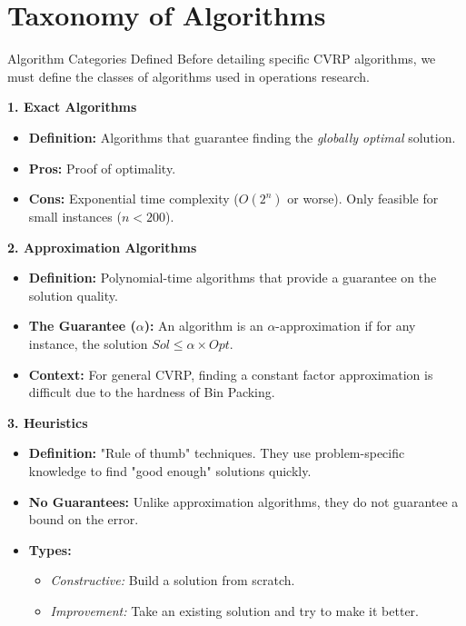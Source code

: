 \documentclass{beamer}
\begin{document}
\section{Taxonomy of Algorithms}

\begin{frame}[allowframebreaks]{Algorithm Categories Defined}
    Before detailing specific CVRP algorithms, we must define the classes of algorithms used in operations research.
    
    \vspace{1em}
    \textbf{1. Exact Algorithms}
    \begin{itemize}
        \item \textbf{Definition:} Algorithms that guarantee finding the \textit{globally optimal} solution.
        \item \textbf{Pros:} Proof of optimality.
        \item \textbf{Cons:} Exponential time complexity ($O(2^n)$ or worse). Only feasible for small instances ($n < 200$).
    \end{itemize}

    \framebreak

    \textbf{2. Approximation Algorithms}
    \begin{itemize}
        \item \textbf{Definition:} Polynomial-time algorithms that provide a guarantee on the solution quality.
        \item \textbf{The Guarantee ($\alpha$):} An algorithm is an $\alpha$-approximation if for any instance, the solution $Sol \le \alpha \times Opt$.
        \item \textbf{Context:} For general CVRP, finding a constant factor approximation is difficult due to the hardness of Bin Packing.
    \end{itemize}

    \framebreak

    \textbf{3. Heuristics}
    \begin{itemize}
        \item \textbf{Definition:} "Rule of thumb" techniques. They use problem-specific knowledge to find "good enough" solutions quickly.
        \item \textbf{No Guarantees:} Unlike approximation algorithms, they do not guarantee a bound on the error.
        \item \textbf{Types:}
        \begin{itemize}
            \item \textit{Constructive:} Build a solution from scratch.
            \item \textit{Improvement:} Take an existing solution and try to make it better.
        \end{itemize}
    \end{itemize}


\end{frame}
\end{document}
